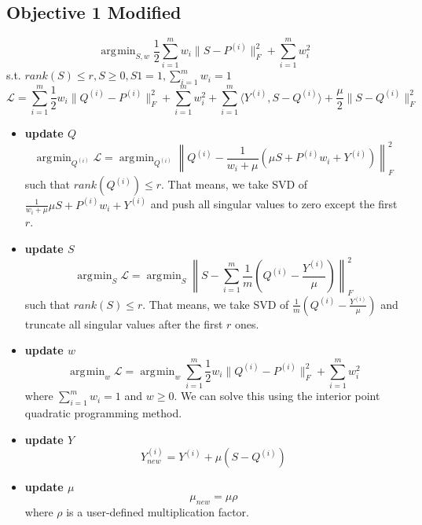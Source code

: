 \documentclass[11pt]{article}
\newcommand{\norm}[1]{\left\lVert#1\right\rVert}
\DeclareMathOperator*{\argmin}{\arg\!\min}
\begin{document}
\subsection*{Objective 1 Modified}
\begin{equation}
\argmin_{S, w}\frac{1}{2} \sum_{i=1}^{m}w_i  \|S - P^{(i)}\|_F^2 + \sum_{i=1}^{m} w_i^2
\end{equation}
s.t. $rank(S) \leq r, S \geq 0, S1 = 1, \sum_{i=1}^{m} w_i = 1$
$$\mathcal{L} = \sum_{i=1}^{m} \frac{1}{2} w_i \|Q^{(i)}-P^{(i)}\|_F^2 + \sum_{i=1}^{m} w_i^2+ \sum_{i=1}^{m} \langle Y^{(i)}, S-Q^{(i)} \rangle + \frac{\mu}{2} \|S - Q^{(i)}\|_F^2 $$
\begin{itemize}
\item \textbf{update $Q$}
$$\argmin_{Q^{(i)}}\mathcal{L} =  
\argmin_{Q^{(i)}}\norm{Q^{(i)} - \frac{1}{w_i + \mu}\left( \mu S + P^{(i)}w_i + Y^{(i)}\right)}_F^2$$
such that $rank(Q^{(i)}) \leq r$. That means, we take SVD of $\frac{1}{w_i + \mu}\mu S + P^{(i)}w_i + Y^{(i)}$ and push all singular values to zero except the first $r$. 
\item  \textbf{update $S$}
$$\argmin_S \mathcal{L} = \argmin_S \norm{
S - \sum_{i=1}^{m} \frac{1}{m} \left(Q^{(i)} - \frac{Y^{(i)}}{\mu} \right)
}_F^2$$
such that $rank(S) \leq r$. That means, we take SVD of $\frac{1}{m} \left( Q^{(i)} - \frac{Y^{(i)}}{\mu} \right)$ and truncate all singular values after the first $r$ ones. 
\item  \textbf{update $w$}
$$\argmin_w \mathcal{L} = \argmin_w \sum_{i=1}^{m} \frac{1}{2} w_i \|Q^{(i)} - P^{(i)} \|_F^2 + \sum_{i=1}^{m} w_i^2$$
where $\sum_{i=1}^{m} w_i = 1$ and $w \geq 0$. We can solve this using the interior point quadratic programming method.

\item \textbf{update $Y$}
$$Y^{(i)}_{new} =Y^{(i)} + \mu (S-Q^{(i)})$$
\item \textbf{update $\mu$}
$$\mu_{new} = \mu \rho$$
where $\rho$ is a user-defined multiplication factor.
\end{itemize}
\end{document}
